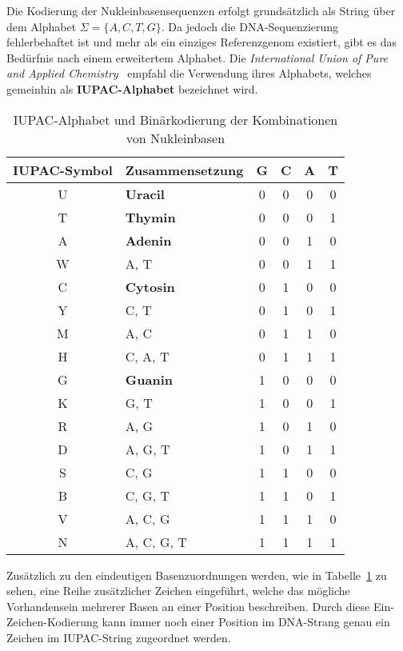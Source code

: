Die Kodierung der Nukleinbasensequenzen erfolgt grundsätzlich als String über dem Alphabet $\Sigma = \lbrace A, C, T, G \rbrace$.
Da jedoch die DNA-Sequenzierung fehlerbehaftet ist und mehr als ein einziges Referenzgenom existiert, gibt es das Bedürfnis nach einem erweitertem Alphabet.
Die \textit{International Union of Pure and Applied Chemistry}~\citep{Iupac} empfahl die Verwendung ihres Alphabets, welches gemeinhin als \textbf{IUPAC-Alphabet} bezeichnet wird.
\begin{table}[htbp]
    \begin{center}
    \begin{tabular}{|clcccc|}
        \hline
        IUPAC-Symbol & Zusammensetzung & \textbf{G} & \textbf{C} & \textbf{A} & \textbf{T} \\
        \hline
        U & \textbf{Uracil} & 0 & 0 & 0 & 0 \\
        \rowcolor{green} T & \textbf{Thymin} & 0 & 0 & 0 & 1 \\
        \rowcolor{green} A & \textbf{Adenin} & 0 & 0 & 1 & 0 \\
        W & A, T & 0 & 0 & 1 & 1 \\
        \rowcolor{green} C & \textbf{Cytosin} & 0 & 1 & 0 & 0 \\
        Y & C, T & 0 & 1 & 0 & 1 \\
        M & A, C & 0 & 1 & 1 & 0 \\
        H & C, A, T & 0 & 1 & 1 & 1 \\
        \rowcolor{green} G & \textbf{Guanin} & 1 & 0 & 0 & 0 \\
        K & G, T & 1 & 0 & 0 & 1 \\
        R & A, G & 1 & 0 & 1 & 0 \\
        D & A, G, T & 1 & 0 & 1 & 1 \\
        S & C, G & 1 & 1 & 0 & 0 \\
        B & C, G, T & 1 & 1 & 0 & 1 \\
        V & A, C, G & 1 & 1 & 1 & 0 \\
        N & A, C, G, T & 1 & 1 & 1 & 1 \\
        \hline
    \end{tabular}
    \end{center}
    \caption{IUPAC-Alphabet und Binärkodierung der Kombinationen von Nukleinbasen}
    \label{tab:data:iupac}
\end{table}
Zusätzlich zu den eindeutigen Basenzuordnungen werden, wie in Tabelle~\ref{tab:data:iupac} zu sehen, eine Reihe zusätzlicher Zeichen eingeführt, welche das mögliche Vorhandensein mehrerer Basen an einer Position beschreiben.
Durch diese Ein-Zeichen-Kodierung kann immer noch einer Position im DNA-Strang genau ein Zeichen im IUPAC-String zugeordnet werden.


